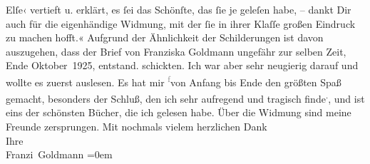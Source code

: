 \begin{ledgroupsized}[t]{13cm}
{{{                  Elſe‹ vertieft u. erklärt, es ſei das Schönſte, das ſie je geleſen habe, –
                  dankt Dir auch für die eigenhändige Widmung, mit der ſie in ihrer Klaſſe großen
                  Eindruck zu machen hofft.« Aufgrund der Ähnlichkeit der Schilderungen ist davon
                  auszugehen, dass der Brief von Franziska
                     Goldmann ungefähr zur selben Zeit, Ende Oktober 1925, entstand.}}}\label{K_L03539-1h} schickten. Ich war aber sehr neugierig
               darauf und wollte es zuerst auslesen. Es hat mir \substVorne{}\textsuperscript{\textcolor{gray}{f}}\substDazwischen{}v\substHinten{}on Anfang bis Ende den größten Spaß gemacht, besonders der Schluß, den ich
               sehr aufregend und tragisch finde\substVorne{}\textsuperscript{.}\substDazwischen{},\substHinten{} und ist eins der schönsten Bücher, die ich gelesen habe. Über die Widmung
               sind meine \label{T_L03539-1v}\label{T_L03539-1h} Freunde zersprungen.\pend
           \pstart
           {\pb}Mit nochmals vielem herzlichen Dank {\\[\baselineskip]}Ihre {\\[\baselineskip]}\spacefill\mbox{Franzi Goldmann}\pend
           \leftskip=0em{}
         
         \endnumbering{}\end{ledgroupsized}  \newcommand{\dateiname}{L03539}\newcommand{\titel}{Franziska Goldmann an Arthur Schnitzler, [Ende Oktober 1925?]}\newcommand{\editorInnen}{Martin Anton Müller und Laura Untner}
      
